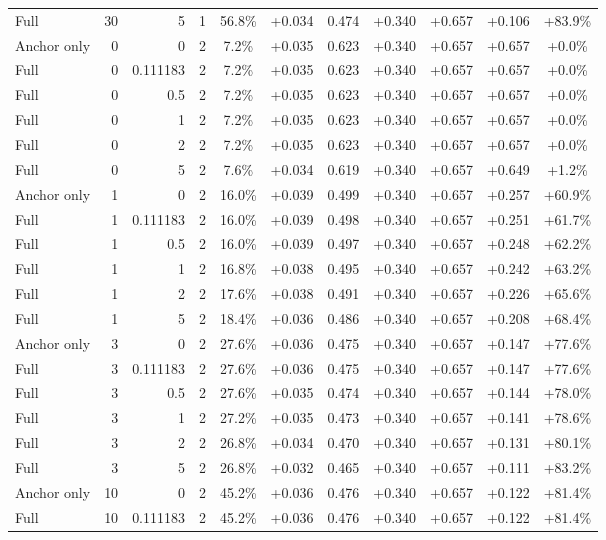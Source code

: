 \begin{table}[htbp]
\begin{tabular}{lrrrccccccc}
Full & 30 & 5 & 1 & 56.8\% & +0.034 & 0.474 & +0.340 & +0.657 & +0.106 & +83.9\% \\
Anchor only & 0 & 0 & 2 & 7.2\% & +0.035 & 0.623 & +0.340 & +0.657 & +0.657 & +0.0\% \\
Full & 0 & 0.111183 & 2 & 7.2\% & +0.035 & 0.623 & +0.340 & +0.657 & +0.657 & +0.0\% \\
Full & 0 & 0.5 & 2 & 7.2\% & +0.035 & 0.623 & +0.340 & +0.657 & +0.657 & +0.0\% \\
Full & 0 & 1 & 2 & 7.2\% & +0.035 & 0.623 & +0.340 & +0.657 & +0.657 & +0.0\% \\
Full & 0 & 2 & 2 & 7.2\% & +0.035 & 0.623 & +0.340 & +0.657 & +0.657 & +0.0\% \\
Full & 0 & 5 & 2 & 7.6\% & +0.034 & 0.619 & +0.340 & +0.657 & +0.649 & +1.2\% \\
Anchor only & 1 & 0 & 2 & 16.0\% & +0.039 & 0.499 & +0.340 & +0.657 & +0.257 & +60.9\% \\
Full & 1 & 0.111183 & 2 & 16.0\% & +0.039 & 0.498 & +0.340 & +0.657 & +0.251 & +61.7\% \\
Full & 1 & 0.5 & 2 & 16.0\% & +0.039 & 0.497 & +0.340 & +0.657 & +0.248 & +62.2\% \\
Full & 1 & 1 & 2 & 16.8\% & +0.038 & 0.495 & +0.340 & +0.657 & +0.242 & +63.2\% \\
Full & 1 & 2 & 2 & 17.6\% & +0.038 & 0.491 & +0.340 & +0.657 & +0.226 & +65.6\% \\
Full & 1 & 5 & 2 & 18.4\% & +0.036 & 0.486 & +0.340 & +0.657 & +0.208 & +68.4\% \\
Anchor only & 3 & 0 & 2 & 27.6\% & +0.036 & 0.475 & +0.340 & +0.657 & +0.147 & +77.6\% \\
Full & 3 & 0.111183 & 2 & 27.6\% & +0.036 & 0.475 & +0.340 & +0.657 & +0.147 & +77.6\% \\
Full & 3 & 0.5 & 2 & 27.6\% & +0.035 & 0.474 & +0.340 & +0.657 & +0.144 & +78.0\% \\
Full & 3 & 1 & 2 & 27.2\% & +0.035 & 0.473 & +0.340 & +0.657 & +0.141 & +78.6\% \\
Full & 3 & 2 & 2 & 26.8\% & +0.034 & 0.470 & +0.340 & +0.657 & +0.131 & +80.1\% \\
Full & 3 & 5 & 2 & 26.8\% & +0.032 & 0.465 & +0.340 & +0.657 & +0.111 & +83.2\% \\
Anchor only & 10 & 0 & 2 & 45.2\% & +0.036 & 0.476 & +0.340 & +0.657 & +0.122 & +81.4\% \\
Full & 10 & 0.111183 & 2 & 45.2\% & +0.036 & 0.476 & +0.340 & +0.657 & +0.122 & +81.4\% \\

\end{tabular}
\end{table}
